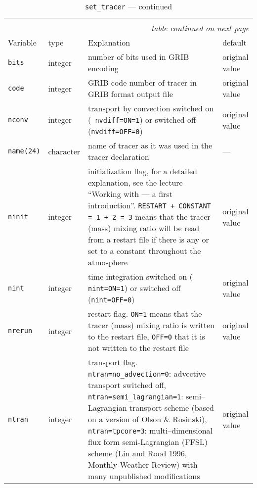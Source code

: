 \begin{longtable}{l@{\extracolsep\fill}lp{7cm}p{3.5cm}}\hline\hline
\caption[Namelist {\tt set\_tracer}]{Namelist 
  {\tt set\_tracer}}\\\hline\label{tabset_tracer}
\endfirsthead
\caption[]{{\tt set\_tracer} --- continued}\\\hline
\endhead
\hline\multicolumn{4}{r}{\slshape table continued on next page}\\
\endfoot
\hline %
\endlastfoot
Variable & type & Explanation & default \\\hline
{\tt bits}\index{namelist variables!bits}
 & integer & number of bits used in GRIB encoding & original
value\\
{\tt code}\index{namelist variables!code}
 & integer & GRIB code number of tracer in GRIB format
output file & original value \\
{\tt nconv}\index{namelist variables!nconv}
 & integer & transport by convection switched on ({\tt
  nvdiff=ON=1}) or switched off ({\tt nvdiff=OFF=0}) & original value\\
{\tt name(24)}\index{namelist variables!name}
 & character & name of tracer as it was used in the
tracer declaration & --- \\
{\tt ninit}\index{namelist variables!ninit}
 & integer & initialization flag, for a detailed
explanation, see the lecture ``Working with \echam{} --- a first
introduction''. {\tt RESTART + CONSTANT = 1 + 2 = 3} means that the
tracer (mass) 
mixing ratio will be read from a restart file if there is any or set
to a constant throughout the atmosphere & original value \\
{\tt nint}\index{namelist variables!nint}
 & integer & time integration switched on ({\tt
  nint=ON=1}) or switched off ({\tt nint=OFF=0}) & original value\\
{\tt nrerun}\index{namelist variables!nrerun}
 & integer & restart flag. {\tt ON=1} means that the tracer
(mass) mixing ratio is written to the restart file, {\tt OFF=0} that it
is not written to the restart file & original value \\
{\tt ntran}\index{namelist variables!ntran}
 & integer & transport flag. {\tt ntran=no\_advection=0}:
advective transport switched off, {\tt ntran=semi\_lagrangian=1}:
semi--Lagrangian transport scheme (based on a version of Olson \&
Rosinski), {\tt ntran=tpcore=3}: multi--dimensional 
flux form semi-Lagrangian (FFSL) scheme (Lin and Rood 1996, Monthly
Weather Review) with many unpublished modifications  & original value \\

\end{longtable}
